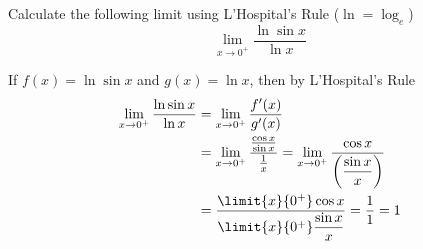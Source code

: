 

\question Calculate the following limit using L'Hospital's Rule ($\ln = \log_e$)
$$\lim_{x\rightarrow 0^+}\dfrac{\ln\sin x}{\ln x}$$


\ifprintanswers
\fi 

\begin{solution}
  If $f(x) = \ln\sin x$ and $g(x) = \ln x$, then by L'Hospital's Rule
  \begin{align}
    \lim_{x\to 0^+}\dfrac{\ln\sin x}{\ln x} &= \lim_{x\to 0^+}\dfrac{f'(x)}{g'(x)} \\
    &= \lim_{x\to 0^+}\dfrac{\frac{\cos x}{\sin x}}{\frac{1}{x}}
     = \lim_{x\to 0^+}\dfrac{\cos x}{\left(\dfrac{\sin x}{x}\right)} \\
     &= \dfrac{\limit{x}{0^+}\cos x}{\limit{x}{0^+}\dfrac{\sin x}{x}} = \dfrac{1}{1} = 1
  \end{align}
\end{solution}

